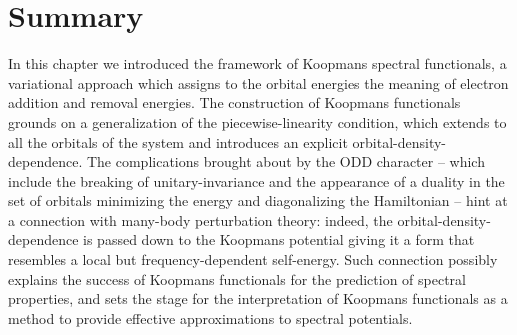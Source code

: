 \clearpage
\section{Summary\label{sec:ch3-summary}}
In this chapter we introduced the framework of Koopmans spectral functionals, a variational approach which assigns to the orbital energies the meaning of electron addition and removal energies. The construction of Koopmans functionals grounds on a generalization of the piecewise-linearity condition, which extends to all the orbitals of the system and introduces an explicit orbital-density-dependence. The complications brought about by the ODD character -- which include the breaking of unitary-invariance and the appearance of a duality in the set of orbitals minimizing the energy and diagonalizing the Hamiltonian -- hint at a connection with many-body perturbation theory: indeed, the orbital-density-dependence is passed down to the Koopmans potential giving it a form that resembles a local but frequency-dependent self-energy. Such connection possibly explains the success of Koopmans functionals for the prediction of spectral properties, and sets the stage for the interpretation of Koopmans functionals as a method to provide effective approximations to spectral potentials.
